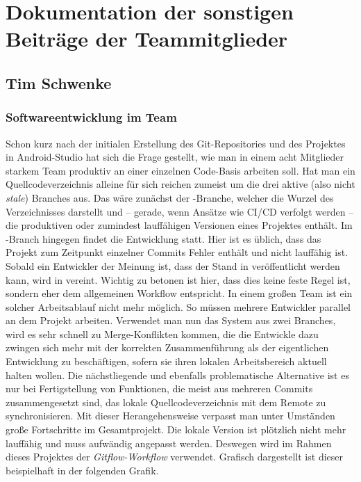 \section{Dokumentation der sonstigen Beiträge der Teammitglieder}


\subsection{Tim Schwenke}

\subsubsection{Softwareentwicklung im Team}

Schon kurz nach der initialen Erstellung des Git-Repositories und des Projektes in Android-Studio hat sich die Frage gestellt, wie man in einem acht Mitglieder starkem Team produktiv an einer einzelnen Code-Basis arbeiten soll. Hat man ein Quellcodeverzeichnis alleine für sich reichen zumeist um die drei aktive (also nicht \textit{stale}) Branches aus. Das wäre zunächst der -Branche, welcher die Wurzel des Verzeichnisses darstellt und – gerade, wenn Ansätze wie CI/CD verfolgt werden – die produktiven oder zumindest lauffähigen Versionen eines Projektes enthält. Im -Branch hingegen findet die Entwicklung statt. Hier ist es üblich, dass das Projekt zum Zeitpunkt einzelner Commits Fehler enthält und nicht lauffähig ist. Sobald ein Entwickler der Meinung ist, dass der Stand in  veröffentlicht werden kann, wird  in  vereint. Wichtig zu betonen ist hier, dass dies keine feste Regel ist, sondern eher dem allgemeinen Workflow entspricht. In einem großen Team ist ein solcher Arbeitsablauf nicht mehr möglich. So müssen mehrere Entwickler parallel an dem Projekt arbeiten. Verwendet man nun das System aus zwei Branches, wird es sehr schnell zu Merge-Konflikten kommen, die die Entwickle dazu zwingen sich mehr mit der korrekten Zusammenführung als der eigentlichen Entwicklung zu beschäftigen, sofern sie ihren lokalen Arbeitsbereich aktuell halten wollen. Die nächstliegende und ebenfalls problematische Alternative ist es nur bei Fertigstellung von Funktionen, die meist aus mehreren Commits zusammengesetzt sind, das lokale Quellcodeverzeichnis mit dem Remote zu synchronisieren. Mit dieser Herangehensweise verpasst man unter Umständen große Fortschritte im Gesamtprojekt. Die lokale Version ist plötzlich nicht mehr lauffähig und muss aufwändig angepasst werden. Deswegen wird im Rahmen dieses Projektes der\textit{ Gitflow-Workflow} verwendet. Grafisch dargestellt ist dieser beispielhaft in der folgenden Grafik.

